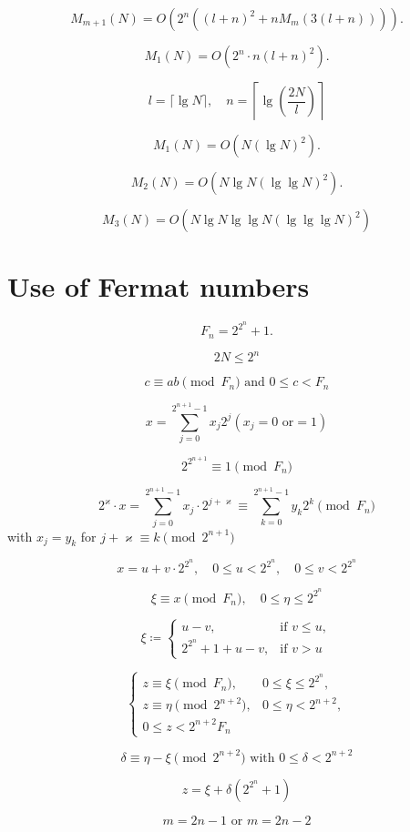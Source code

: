 \documentclass{article}
\begin{document}
\[
\tag{3.10}
M_{m + 1}(N) = O(2^n((l + n)^2 + nM_m(3(l + n)))).
\]

\[
M_1(N) = O(2^n \cdot n(l + n)^2).
\]

\[
l = \lceil \lg N \rceil, \quad n = \left\lceil \lg\left(\frac{2N}{l}\right)\right\rceil
\]

\[
\tag{3.11}
M_1(N) = O(N (\lg N)^2).
\]

\[
M_2(N) = O(N \lg N (\lg \lg N)^2).
\]

\[
M_3(N) = O(N \lg N \lg \lg N (\lg \lg \lg N)^2)
\]

\section{Use of Fermat numbers}
\[
F_n = 2^{2^n} + 1.
\]

\[
\tag{4.1}
2N \le 2^n
\]

\[
\tag{4.2}
c \equiv ab \pmod{F_n}\text{ and }0 \le c < F_n
\]

\[
\tag{4.3}
x = \sum_{j = 0}^{2^{n + 1} - 1} x_j 2^j (x_j = 0\text{ or}= 1)
\]

\[
\tag{4.4}
2^{2^{n + 1}} \equiv 1 \pmod{F_n}
\]

\[
2^\varkappa \cdot x = \sum_{j = 0}^{2^{n + 1} - 1} x_j \cdot 2^{j + \varkappa} \equiv \sum_{k = 0}^{2^{n + 1} - 1} y _k 2^k \pmod{F_n}
\] with $x_j = y_k$ for $j + \varkappa \equiv k \pmod {2^{n + 1}}$

\[
\tag{4.5}
x = u + v \cdot 2^{2^n}, \quad 0 \le u < 2^{2^n}, \quad 0 \le v < 2^{2^n}
\]

\[
\xi \equiv x \pmod{F_n}, \quad 0 \le \eta \le 2^{2^n}
\]

\[
\tag{4.6}
\xi \coloneq
\begin{cases}
u - v, & \text{if }v \le u,\\
2^{2^n} + 1 + u - v, & \text{if }v > u
\end{cases}
\]

\[
\tag{4.7}
\begin{cases}
z \equiv \xi \pmod{F_n}, & 0 \le \xi \le 2^{2^n}, \\
z \equiv \eta \pmod{2^{n + 2}}, & 0 \le \eta < 2^{n + 2}, \\
0 \le z < 2^{n + 2} F_n
\end{cases}
\]

\[
\delta \equiv \eta - \xi \pmod{2^{n + 2}}\text{ with }0 \le \delta < 2^{n + 2}
\]

\[
z = \xi + \delta\left(2^{2^n} + 1\right)
\]

\[
\tag{4.8}
m = 2n - 1\text{ or }m = 2n - 2
\]
\end{document}
